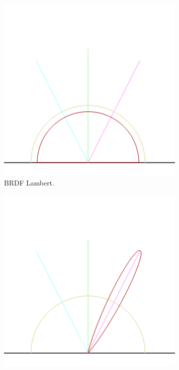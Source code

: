 \begin{figure}[H]
	\centering
	\begin{subfigure}[t]{.33\linewidth}
		\centering
		\captionsetup{justification=centering}
		\includegraphics[width=\linewidth]{media/lambert.png}
		\caption*{\ac{BRDF} Lambert.}
	\end{subfigure}\hfill
	\begin{subfigure}[t]{.33\linewidth}
		\centering
		\captionsetup{justification=centering}
		\includegraphics[width=\linewidth]{media/blinn_phong_spec.png}

\end{subfigure}
\end{figure}
